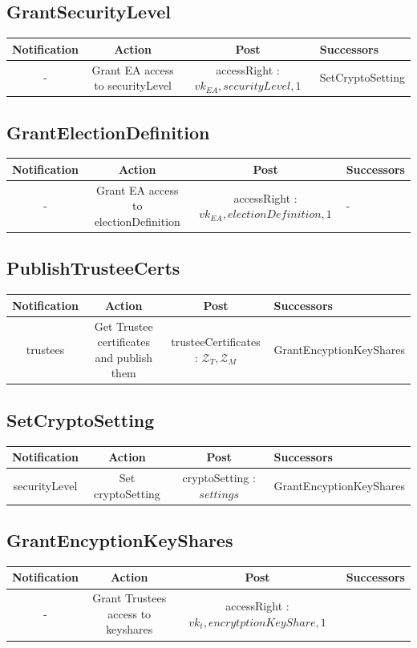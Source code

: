 \documentclass[bibtotoc,halfparskip,oneside]{scrreprt}
\begin{document}
\begin{landscape}
\subsection{GrantSecurityLevel}
\begin{tabularx}{\linewidth}{|c|c|c|X|}
\hline Notification & Action & Post & Successors\\ 
\hline - & Grant EA access to securityLevel & accessRight : $vk_{EA} , securityLevel, 1 $ & SetCryptoSetting \\ 
\hline 
\end{tabularx}

\subsection{GrantElectionDefinition}
\begin{tabularx}{\linewidth}{|c|c|c|X|}
\hline Notification & Action & Post & Successors\\ 
\hline - & Grant EA access to electionDefinition & accessRight : $vk_{EA} , electionDefinition, 1 $ & - \\ 
\hline 
\end{tabularx}

\subsection{PublishTrusteeCerts}
\begin{tabularx}{\linewidth}{|c|c|c|X|}
\hline Notification & Action & Post & Successors\\ 
\hline trustees & Get Trustee certificates and publish them & trusteeCertificates : $\mathcal{Z}_T , \mathcal{Z}_M$ & GrantEncyptionKeyShares \\ 
\hline 
\end{tabularx}


\subsection{SetCryptoSetting}
\begin{tabularx}{\linewidth}{|c|c|c|X|}
\hline Notification & Action & Post & Successors\\  
\hline securityLevel & Set cryptoSetting & cryptoSetting : $settings$  & GrantEncyptionKeyShares \\  
\hline 
\end{tabularx}

\subsection{GrantEncyptionKeyShares}
\begin{tabularx}{\linewidth}{|c|c|c|X|}
\hline Notification & Action & Post & Successors\\  
\hline  - & Grant Trustees access to keyshares & accessRight : $vk_t, encrytptionKeyShare , 1 $ &   \\ 
\hline 
\end{tabularx}


\end{landscape}
\end{document}
